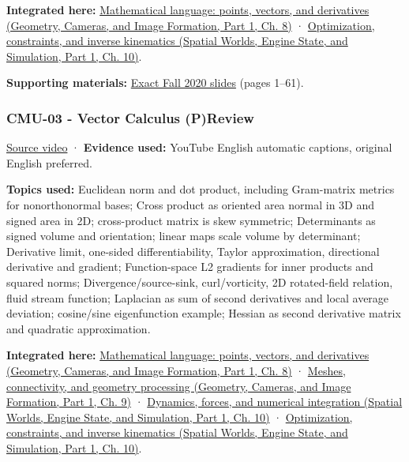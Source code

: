 \textbf{Integrated here:} \href{../03-Geometry-Cameras-and-Image-Formation-P01/main.pdf\#nameddest=03-visual-computing-i-ch001-mathematical-language-points-vectors-and-derivatives}{Mathematical language: points, vectors, and derivatives (Geometry, Cameras, and Image Formation, Part 1, Ch. 8)} · \href{../05-Spatial-Worlds-Engine-State-and-Simulation-P01/main.pdf\#nameddest=04-visual-computing-ii-ch029-optimization-constraints-and-inverse-kinematics}{Optimization, constraints, and inverse kinematics (Spatial Worlds, Engine State, and Simulation, Part 1, Ch. 10)}.

\textbf{Supporting materials:} \href{https://15462.courses.cs.cmu.edu/fall2020content/lectures/02_linearalgebra/02_linearalgebra_slides.pdf}{Exact Fall 2020 slides} (pages 1--61).

\subsubsection{CMU-03 - Vector Calculus (P)Review}\label{04-visual-computing-ii-ch036-cmu-03---vector-calculus-preview}

\hypertarget{04-visual-computing-ii-ch036-cmu-03---vector-calculus-preview}{}

\href{https://www.youtube.com/watch?v=O7Bec2uX3ZQ}{Source video} · \textbf{Evidence used:} YouTube English automatic captions, original English preferred.

\textbf{Topics used:} Euclidean norm and dot product, including Gram-matrix metrics for nonorthonormal bases; Cross product as oriented area normal in 3D and signed area in 2D; cross-product matrix is skew symmetric; Determinants as signed volume and orientation; linear maps scale volume by determinant; Derivative limit, one-sided differentiability, Taylor approximation, directional derivative and gradient; Function-space L2 gradients for inner products and squared norms; Divergence/source-sink, curl/vorticity, 2D rotated-field relation, fluid stream function; Laplacian as sum of second derivatives and local average deviation; cosine/sine eigenfunction example; Hessian as second derivative matrix and quadratic approximation.

\textbf{Integrated here:} \href{../03-Geometry-Cameras-and-Image-Formation-P01/main.pdf\#nameddest=03-visual-computing-i-ch001-mathematical-language-points-vectors-and-derivatives}{Mathematical language: points, vectors, and derivatives (Geometry, Cameras, and Image Formation, Part 1, Ch. 8)} · \href{../03-Geometry-Cameras-and-Image-Formation-P01/main.pdf\#nameddest=03-visual-computing-i-ch002-meshes-connectivity-and-geometry-processing}{Meshes, connectivity, and geometry processing (Geometry, Cameras, and Image Formation, Part 1, Ch. 9)} · \href{../05-Spatial-Worlds-Engine-State-and-Simulation-P01/main.pdf\#nameddest=04-visual-computing-ii-ch029-dynamics-forces-and-numerical-integration}{Dynamics, forces, and numerical integration (Spatial Worlds, Engine State, and Simulation, Part 1, Ch. 10)} · \href{../05-Spatial-Worlds-Engine-State-and-Simulation-P01/main.pdf\#nameddest=04-visual-computing-ii-ch029-optimization-constraints-and-inverse-kinematics}{Optimization, constraints, and inverse kinematics (Spatial Worlds, Engine State, and Simulation, Part 1, Ch. 10)}.

